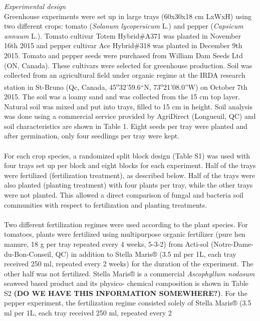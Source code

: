 \documentclass[11pt,]{article}
\begin{document}
\emph{Experimental design}\\
Greenhouse experiments were set up in large trays (60x30x18 cm LxWxH)
using two different crops: tomato (\emph{Solanum lycopersicum} L.) and
pepper (\emph{Capsicum annuum} L.). Tomato cultivar Totem Hybrid\#A371
was planted in November 16th 2015 and pepper cultivar Ace Hybrid\#318
was planted in December 9th 2015. Tomato and pepper seeds were purchased
from William Dam Seeds Ltd (ON, Canada). These cultivars were selected
for greenhouse production. Soil was collected from an agricultural field
under organic regime at the IRDA research station in St-Bruno (Qc,
Canada, 45\textsuperscript{o}32'59.6``N,
73\textsuperscript{o}21'08.0''W) on October 7th 2015. The soil was a
loamy sand and was collected from the 15 cm top layer. Natural soil was
mixed and put into trays, filled to 15 cm in height. Soil analysis was
done using a commercial service provided by AgriDirect (Longueuil, QC)
and soil characteristics are shown in Table 1. Eight seeds per tray were
planted and after germination, only four seedlings per tray were kept.\\
\hspace*{0.333em}\\
For each crop species, a randomized split block design (Table S1) was
used with four trays set up per block and eight blocks for each
experiment. Half of the trays were fertilized (fertilization treatment),
as described below. Half of the trays were also planted (planting
treatment) with four plants per tray, while the other trays were not
planted. This allowed a direct comparison of fungal and bacteria soil
communities with respect to fertilization and planting treatments.\\
\hspace*{0.333em}\\
Two different fertilization regimes were used according to the plant
species. For tomatoes, plants were fertilized using multipurpose organic
fertilizer (pure hen manure, 18 g per tray repeated every 4 weeks,
5-3-2) from Acti-sol (Notre-Dame-du-Bon-Conseil, QC) in addition to
Stella Maris® (3.5 ml per 1L, each tray received 250 ml, repeated every
2 weeks) for the duration of the experiment. The other half was not
fertilized. Stella Maris® is a commercial \emph{Ascophyllum nodosum}
seaweed based product and its physico- chemical composition is shown in
Table S2 \textbf{(DO WE HAVE THIS INFORMATION SOMEWHERE?)}. For the
pepper experiment, the fertilization regime consisted solely of Stella
Maris® (3.5 ml per 1L, each tray received 250 ml, repeated every 2
\end{document}
